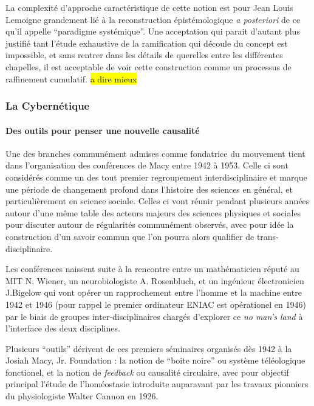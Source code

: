 La complexité d'approche caractéristique de cette notion est pour Jean Louis Lemoigne grandement lié à la reconstruction épistémologique \textit{a posteriori} de ce qu'il appelle \enquote{paradigme systémique}. Une acceptation qui parait d'autant plus justifié tant l'étude exhaustive de la ramification qui découle du concept est impossible, et sans rentrer dans les détails de querelles entre les différentes chapelles, il est acceptable de voir cette construction comme un processus de raffinement cumulatif. \hl{a dire mieux}

\subsubsection{La Cybernétique}
\label{ssubsec:cybernetic}

\paragraph{Des outils pour penser une nouvelle causalité}

Une des branches communément admises comme fondatrice du mouvement tient dans l'organisation des conférences de Macy entre 1942 à 1953. Celle ci sont considérés comme un des tout premier regroupement interdisciplinaire et marque une période de changement profond dans l'histoire des sciences en général, et particulièrement en science sociale. Celles ci vont réunir pendant plusieurs années autour d'une même table des acteurs majeurs des sciences physiques et sociales pour discuter autour de régularités communément observés, avec pour idée la construction d'un savoir commun que l'on pourra alors qualifier de trans-disciplinaire. 

Les conférences naissent suite à la rencontre entre un mathématicien réputé au MIT N. Wiener, un neurobiologiste A. Rosenbluch, et un ingénieur électronicien J.Bigelow qui vont opérer un rapprochement entre l'homme et la machine entre 1942 et 1946 (pour rappel le premier ordinateur ENIAC est opérationel en 1946) par le biais de groupes inter-disciplinaires chargés d'explorer ce \textit{no man's land} à l'interface des deux disciplines. 

Plusieurs \enquote{outils} dérivent de ces premiers séminaires organisés dès 1942 à la Josiah Macy, Jr. Foundation : la notion de \enquote{boite noire} ou système téléologique fonctionel, et la notion de \textit{feedback} ou causalité circulaire, avec pour objectif principal l'étude de l'homéostasie introduite auparavant par les travaux pionniers du physiologiste Walter Cannon en 1926.

